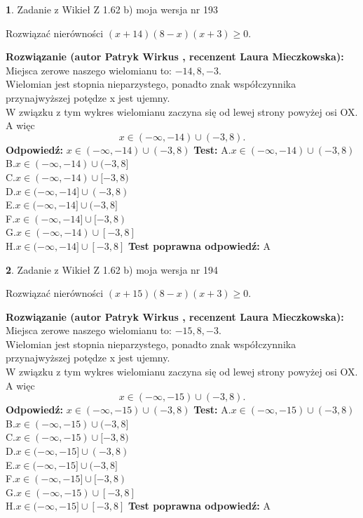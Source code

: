 \documentclass[12pt, a4paper]{article}
\theoremstyle{definition} %
\newtheorem{zad}{}
\newcommand{\zadStart}[1]{\begin{zad}#1\newline}
\newcommand{\zadStop}{\end{zad}}
\newcommand{\rozwStart}[2]{\noindent \textbf{Rozwiązanie (autor #1 , recenzent #2): }\newline}
\newcommand{\rozwStop}{\newline}
\newcommand{\odpStart}{\noindent \textbf{Odpowiedź:}\newline}
\newcommand{\odpStop}{\newline}
\newcommand{\testStart}{\noindent \textbf{Test:}\newline}
\newcommand{\testStop}{\newline}
\newcommand{\kluczStart}{\noindent \textbf{Test poprawna odpowiedź:}\newline}
\newcommand{\kluczStop}{\newline}
\begin{document}
\zadStart{Zadanie z Wikieł Z 1.62 b) moja wersja nr 193}

Rozwiązać nierówności $(x+14)(8-x)(x+3)\ge0$.
\zadStop
\rozwStart{Patryk Wirkus}{Laura Mieczkowska}
Miejsca zerowe naszego wielomianu to: $-14, 8, -3$.\\
Wielomian jest stopnia nieparzystego, ponadto znak współczynnika przy\linebreak najwyższej potędze x jest ujemny.\\ W związku z tym wykres wielomianu zaczyna się od lewej strony powyżej osi OX. A więc $$x \in (-\infty,-14) \cup (-3,8).$$
\rozwStop
\odpStart
$x \in (-\infty,-14) \cup (-3,8)$
\odpStop
\testStart
A.$x \in (-\infty,-14) \cup (-3,8)$\\
B.$x \in (-\infty,-14) \cup (-3,8]$\\
C.$x \in (-\infty,-14) \cup [-3,8)$\\
D.$x \in (-\infty,-14] \cup (-3,8)$\\
E.$x \in (-\infty,-14] \cup (-3,8]$\\
F.$x \in (-\infty,-14] \cup [-3,8)$\\
G.$x \in (-\infty,-14) \cup [-3,8]$\\
H.$x \in (-\infty,-14] \cup [-3,8]$
\testStop
\kluczStart
A
\kluczStop



\zadStart{Zadanie z Wikieł Z 1.62 b) moja wersja nr 194}

Rozwiązać nierówności $(x+15)(8-x)(x+3)\ge0$.
\zadStop
\rozwStart{Patryk Wirkus}{Laura Mieczkowska}
Miejsca zerowe naszego wielomianu to: $-15, 8, -3$.\\
Wielomian jest stopnia nieparzystego, ponadto znak współczynnika przy\linebreak najwyższej potędze x jest ujemny.\\ W związku z tym wykres wielomianu zaczyna się od lewej strony powyżej osi OX. A więc $$x \in (-\infty,-15) \cup (-3,8).$$
\rozwStop
\odpStart
$x \in (-\infty,-15) \cup (-3,8)$
\odpStop
\testStart
A.$x \in (-\infty,-15) \cup (-3,8)$\\
B.$x \in (-\infty,-15) \cup (-3,8]$\\
C.$x \in (-\infty,-15) \cup [-3,8)$\\
D.$x \in (-\infty,-15] \cup (-3,8)$\\
E.$x \in (-\infty,-15] \cup (-3,8]$\\
F.$x \in (-\infty,-15] \cup [-3,8)$\\
G.$x \in (-\infty,-15) \cup [-3,8]$\\
H.$x \in (-\infty,-15] \cup [-3,8]$
\testStop
\kluczStart
A
\kluczStop
\end{document}

